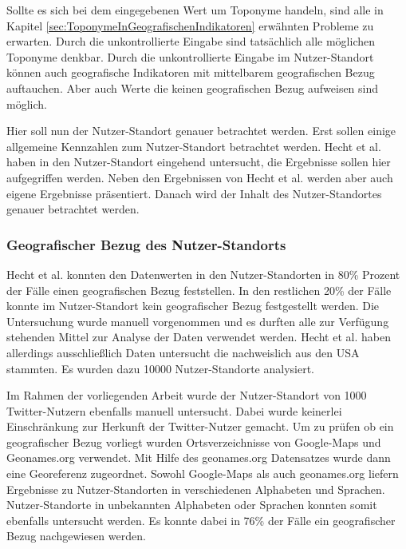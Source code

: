 			Sollte es sich bei dem eingegebenen Wert um Toponyme handeln, sind alle in Kapitel \ref{sec:ToponymeInGeografischenIndikatoren} erwähnten Probleme zu erwarten.
			Durch die unkontrollierte Eingabe sind tatsächlich alle möglichen Toponyme denkbar.
			Durch die unkontrollierte Eingabe im Nutzer-Standort können auch geografische Indikatoren mit mittelbarem geografischen Bezug auftauchen.
			Aber auch Werte die keinen geografischen Bezug aufweisen sind möglich.	

			Hier soll nun der Nutzer-Standort genauer betrachtet werden.
			Erst sollen einige allgemeine Kennzahlen zum Nutzer-Standort betrachtet werden.
			Hecht et al. haben in \cite{Hecht2011} den Nutzer-Standort eingehend untersucht, die Ergebnisse sollen hier aufgegriffen werden.
			Neben den Ergebnissen von Hecht et al. werden aber auch eigene Ergebnisse präsentiert.
			Danach wird der Inhalt des Nutzer-Standortes genauer betrachtet werden.

			\subsubsection{Geografischer Bezug des Nutzer-Standorts} 
				
				Hecht et al. konnten den Datenwerten in den Nutzer-Standorten in 80\% Prozent der Fälle einen geografischen Bezug feststellen.
				In den restlichen 20\% der Fälle konnte im Nutzer-Standort kein geografischer Bezug festgestellt werden. 
				Die Untersuchung wurde manuell vorgenommen und es durften alle zur Verfügung stehenden Mittel zur Analyse der Daten verwendet werden. 
				Hecht et al. haben allerdings ausschließlich Daten untersucht die nachweislich aus den USA stammten. 
				Es wurden dazu 10000 Nutzer-Standorte analysiert.

				Im Rahmen der vorliegenden Arbeit wurde der Nutzer-Standort von 1000 Twitter-Nutzern ebenfalls manuell untersucht. 
				Dabei wurde keinerlei Einschränkung zur Herkunft der Twitter-Nutzer gemacht.
				Um zu prüfen ob ein geografischer Bezug vorliegt wurden Ortsverzeichnisse von Google-Maps und Geonames.org verwendet.
				Mit Hilfe des geonames.org Datensatzes wurde dann eine Georeferenz zugeordnet.
				Sowohl Google-Maps als auch geonames.org liefern Ergebnisse zu Nutzer-Standorten in verschiedenen Alphabeten und Sprachen.
				Nutzer-Standorte in unbekannten Alphabeten oder Sprachen konnten somit ebenfalls untersucht werden.
				Es konnte dabei in 76\% der Fälle ein geografischer Bezug nachgewiesen werden. 

